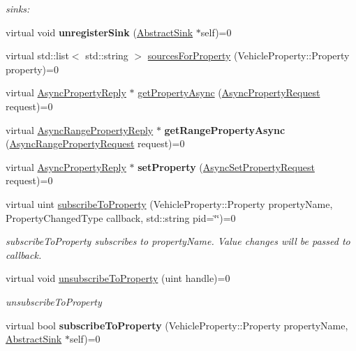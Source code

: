 \begin{DoxyCompactItemize}
\begin{DoxyCompactList}\small\item\em sinks\-: \end{DoxyCompactList}\item 
\hypertarget{classAbstractRoutingEngine_a0f0a96c938c395565d01e0f78cc3bea8}{virtual void {\bfseries unregister\-Sink} (\hyperlink{classAbstractSink}{Abstract\-Sink} $\ast$self)=0}\label{classAbstractRoutingEngine_a0f0a96c938c395565d01e0f78cc3bea8}

\item 
virtual std\-::list$<$ std\-::string $>$ \hyperlink{classAbstractRoutingEngine_a9eb81869eaa35dc53f1c0eb6d53f7968}{sources\-For\-Property} (Vehicle\-Property\-::\-Property property)=0
\item 
virtual \hyperlink{classAsyncPropertyReply}{Async\-Property\-Reply} $\ast$ \hyperlink{classAbstractRoutingEngine_ad1cbda415f674be4a3ce49be05aa8ee8}{get\-Property\-Async} (\hyperlink{classAsyncPropertyRequest}{Async\-Property\-Request} request)=0
\item 
\hypertarget{classAbstractRoutingEngine_a335eaf3aea69c5b55b28819119156dd6}{virtual \hyperlink{classAsyncRangePropertyReply}{Async\-Range\-Property\-Reply} $\ast$ {\bfseries get\-Range\-Property\-Async} (\hyperlink{classAsyncRangePropertyRequest}{Async\-Range\-Property\-Request} request)=0}\label{classAbstractRoutingEngine_a335eaf3aea69c5b55b28819119156dd6}

\item 
\hypertarget{classAbstractRoutingEngine_a740b2c9bd8f842499cf250f660553651}{virtual \hyperlink{classAsyncPropertyReply}{Async\-Property\-Reply} $\ast$ {\bfseries set\-Property} (\hyperlink{classAsyncSetPropertyRequest}{Async\-Set\-Property\-Request} request)=0}\label{classAbstractRoutingEngine_a740b2c9bd8f842499cf250f660553651}

\item 
virtual uint \hyperlink{classAbstractRoutingEngine_a1641a8e29180b5faf57ac3bfa3f10cf0}{subscribe\-To\-Property} (Vehicle\-Property\-::\-Property property\-Name, Property\-Changed\-Type callback, std\-::string pid=\char`\"{}\char`\"{})=0
\begin{DoxyCompactList}\small\item\em subscribe\-To\-Property subscribes to property\-Name. Value changes will be passed to callback. \end{DoxyCompactList}\item 
virtual void \hyperlink{classAbstractRoutingEngine_aa56c145aa682ece99791831bc7c420f7}{unsubscribe\-To\-Property} (uint handle)=0
\begin{DoxyCompactList}\small\item\em unsubscribe\-To\-Property \end{DoxyCompactList}\item 
\hypertarget{classAbstractRoutingEngine_ac2690c98fc6d0ccd1fd8cb9b8249644d}{virtual bool {\bfseries subscribe\-To\-Property} (Vehicle\-Property\-::\-Property property\-Name, \hyperlink{classAbstractSink}{Abstract\-Sink} $\ast$self)=0}\label{classAbstractRoutingEngine_ac2690c98fc6d0ccd1fd8cb9b8249644d}


\end{DoxyCompactItemize}
